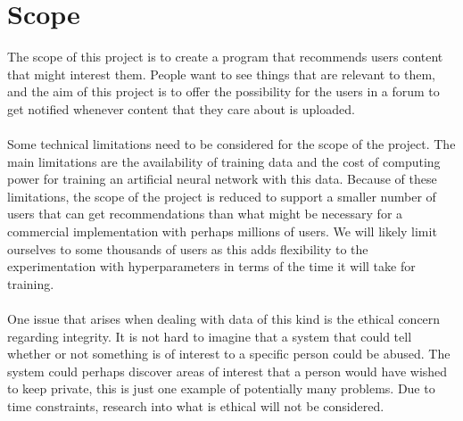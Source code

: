 \section{Scope}
The scope of this project is to create a program that recommends users content that might interest them. People want to see things that are relevant to them, and the aim of this project is to offer the possibility for the users in a forum to get notified whenever content that they care about is uploaded.
\\\\
Some technical limitations need to be considered for the scope of the project. The main limitations are the availability of training data and the cost of computing power for training an artificial neural network with this data. Because of these limitations, the scope of the project is reduced to support a smaller number of users that can get recommendations than what might be necessary for a commercial implementation with perhaps millions of users. We will likely limit ourselves to some thousands of users as this adds flexibility to the experimentation with hyperparameters in terms of the time it will take for training.  
\\\\
One issue that arises when dealing with data of this kind is the ethical concern regarding integrity. It is not hard to imagine that a system that could tell whether or not something is of interest to a specific person could be abused. The system could perhaps discover areas of interest that a person would have wished to keep private, this is just one example of potentially many problems. Due to time constraints, research into what is ethical will not be considered. 

